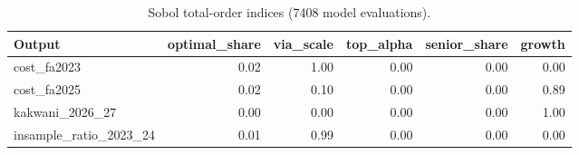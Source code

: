 \begin{table}[t]
\centering\small
\caption{Sobol total-order indices (7408 model evaluations).}
\label{tab:sensitivity}
\begin{tabular}{lrrrrr}
\toprule
Output & optimal\_share & via\_scale & top\_alpha & senior\_share & growth \\
\midrule
cost\_fa2023 & 0.02 & 1.00 & 0.00 & 0.00 & 0.00 \\
cost\_fa2025 & 0.02 & 0.10 & 0.00 & 0.00 & 0.89 \\
kakwani\_2026\_27 & 0.00 & 0.00 & 0.00 & 0.00 & 1.00 \\
insample\_ratio\_2023\_24 & 0.01 & 0.99 & 0.00 & 0.00 & 0.00 \\
\bottomrule
\end{tabular}
\end{table}
